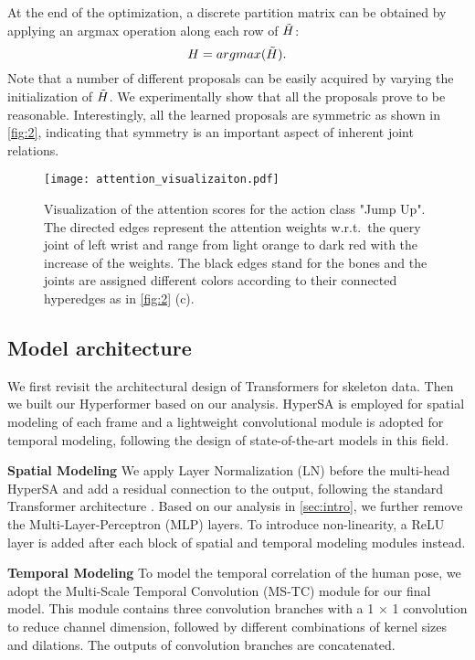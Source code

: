 \documentclass[10pt,twocolumn,letterpaper]{article}
\begin{document}
At the end of the optimization, a discrete partition matrix can be obtained by applying an argmax operation along each row of $\Tilde{H}$:
\begin{equation}
    H = argmax(\Tilde{H}).
\end{equation}
Note that a number of different proposals can be easily acquired by varying the initialization of $\Tilde{H}$. We experimentally show that all the proposals prove to be reasonable. Interestingly, all the learned proposals are symmetric as shown in \cref{fig:2}, indicating that symmetry is an important aspect of inherent joint relations. 

\begin{figure*}[ht]
  \centering
      \texttt{[image: attention\_visualizaiton.pdf]}
     \caption{Visualization of the attention scores for the action class "Jump Up". The directed edges represent the attention weights w.r.t.~the query joint of left wrist and range from light orange to dark red with the increase of the weights. The black edges stand for the bones and the joints are assigned different colors according to their connected hyperedges as in \cref{fig:2} (c). }
     \label{fig:attention}
\end{figure*}

\subsection{Model architecture}

We first revisit the architectural design of Transformers for skeleton data.
Then we built our Hyperformer based on our analysis. HyperSA is employed for spatial modeling of each frame and a lightweight convolutional module is adopted for temporal modeling, following the design of state-of-the-art models \cite{chi2022infogcn, chen2021channel} in this field. 



\noindent \textbf{Spatial Modeling}
We apply Layer Normalization (LN) before the multi-head HyperSA and add a residual connection to the output, following the standard Transformer architecture \cite{vaswani2017attention}.
Based on our analysis in \cref{sec:intro}, we further remove the Multi-Layer-Perceptron (MLP) layers. To introduce non-linearity, a ReLU layer is added after each block of spatial and temporal modeling modules instead.



\noindent \textbf{Temporal Modeling}
To model the temporal correlation of
the human pose, we adopt the Multi-Scale Temporal Convolution (MS-TC) module \cite{chen2021channel, liu2020disentangling, chi2022infogcn} for our final model. This module contains three convolution branches with a 1 × 1 convolution to reduce channel dimension, followed by different combinations of kernel sizes
and dilations. The outputs of convolution branches are
concatenated.
\end{document}
